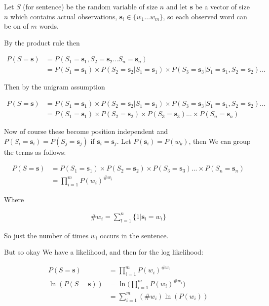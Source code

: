 \documentclass{article}
\begin{document}
		Let $S$ (for sentence) be the random variable of size $n$ and let $\mathbf{s}$ be a vector of size $n$ which contains actual observations, $\mathbf{s}_i\in\{ w_1\ldots w_m \}$, so each observed word can be on of $m$ words.
		
		By the product rule then
		
		\begin{align}
			P(S=\mathbf{s}) &= P(S_1=\mathbf{s}_1, S_2=\mathbf{s}_2\ldots S_n=\mathbf{s}_n)\\
			&= P(S_1=\mathbf{s}_1)\times P(S_2=\mathbf{s}_2 | S_1=\mathbf{s}_1) \times P(S_3=\mathbf{s}_3 | S_1=\mathbf{s}_1, S_2=\mathbf{s}_2)...
		\end{align}		
			
		Then by the unigram assumption
		
		\begin{align}
			P(S=\mathbf{s}) &= P(S_1=\mathbf{s}_1)\times P(S_2=\mathbf{s}_2 | S_1=\mathbf{s}_1) \times P(S_3=\mathbf{s}_3 | S_1=\mathbf{s}_1, S_2=\mathbf{s}_2)...\\
			&= P(S_1=\mathbf{s}_1)\times P(S_2=\mathbf{s}_2)\times P(S_3=\mathbf{s}_3)\ldots \times P(S_n=\mathbf{s}_n)
		\end{align}
		
		Now of course these become position independent and $P(S_i=\mathbf{s}_i) = P(S_j=\mathbf{s}_j)$ if $\mathbf{s}_i = \mathbf{s}_j$. Let $P(\mathbf{s}_i) = P(w_k)$, then We can group the terms as follows:
		
		\begin{align}
			P(S=\mathbf{s}) &= P(S_1=\mathbf{s}_1)\times P(S_2=\mathbf{s}_2)\times P(S_3=\mathbf{s}_3)\ldots \times P(S_n=\mathbf{s}_n)\\
			&= \prod^m_{i=1} P(w_i)^{\#w_i}
		\end{align}
			
		Where
		
		\begin{align}
			\# w_i = \sum^n_{l = 1} \{1|\mathbf{s}_l = w_i \}
		\end{align}
		
		So just the number of times $w_i$ occurs in the sentence.
		
		But so okay We have a likelihood, and then for the log likelihood:
		
		\begin{align}
			P(S=\mathbf{s}) &= \prod^m_{i=1} P(w_i)^{\#w_i}\\
			\ln(P(S=\mathbf{s})) &= \ln\bigg(\prod^m_{i=1} P(w_i)^{\#w_i}\bigg)\\
			&= \sum^m_{i=1} (\#w_i)\ln (P(w_i))\\
		\end{align}
		
\end{document}

